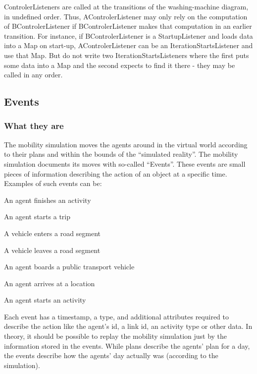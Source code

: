 ControlerListeners are called at the transitions of the washing-machine diagram, in undefined order.
Thus, AControlerListener may only rely on the computation of BControlerListener if BControlerListener
 makes that computation in an earlier transition. For instance, if BControlerListener is a StartupListener
 and loads data into a Map on start-up, AControlerListener can be an IterationStartsListener and use that Map.
 But do not write two IterationStartsListeners where the first puts some data into a Map and the second expects
 to find it there - they may be called in any order.

\subsection{Events}
\label{sec:events-extension-point}

\subsubsection{What they are}
The mobility simulation moves the agents around in the virtual world according to their plans and within the bounds of the ``simulated reality''. The mobility simulation documents its moves with so-called ``Events''. These events are small pieces of information describing the action of an object at a specific time. Examples of such events can be:
\begin{compactitem}
\item    An agent finishes an activity
\item     An agent starts a trip
\item    A vehicle enters a road segment
\item     A vehicle leaves a road segment
\item     An agent boards a public transport vehicle
\item     An agent arrives at a location
\item     An agent starts an activity
\end{compactitem}

Each event has a timestamp, a type, and additional attributes required to describe the action like the agent's id, a link id, an activity type or other data. In theory, it should be possible to replay the mobility simulation just by the information stored in the events. While plans describe the agents' plan for a day, the events describe how the agents' day actually was (according to the simulation).


